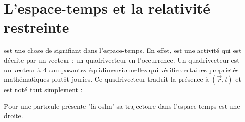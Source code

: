 \documentclass[11pt]{book}
\begin{document}
\section{L'espace-temps et la relativité restreinte}
 est une chose de signifiant dans l'espace-temps. En effet,  est une activité qui est décrite par un vecteur : un quadrivecteur en l'occurrence. Un quadrivecteur est un vecteur à 4 composantes équidimensionnelles qui vérifie certaines propriétés mathématiques plutôt joulies. Ce quadrivecteur traduit la présence à $(\vec{r},t)$ et est noté tout simplement :


Pour une particule présente "là oslm" sa trajectoire dans l'espace temps est une droite.
\end{document}
